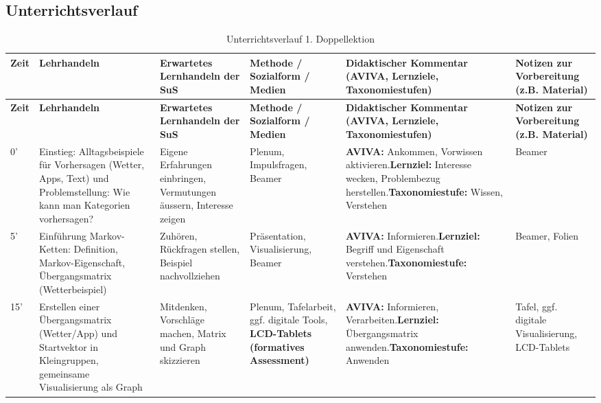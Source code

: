 \begin{landscape}
    
    \section*{Unterrichtsverlauf}


        \begin{longtable}{@{}l|p{5cm}|p{5cm}|p{4cm}|p{5cm}|p{5cm}@{}}
            \caption{Unterrichtsverlauf 1. Doppellektion}\\
            \textbf{Zeit} & \textbf{Lehrhandeln} & \textbf{Erwartetes Lernhandeln der SuS} & \textbf{Methode / Sozialform / Medien} & \textbf{Didaktischer Kommentar (AVIVA, Lernziele, Taxonomiestufen)} & \textbf{Notizen zur Vorbereitung (z.B. Material)} \\\midrule\midrule
            \endfirsthead
            \textbf{Zeit} & \textbf{Lehrhandeln} & \textbf{Erwartetes Lernhandeln der SuS} & \textbf{Methode / Sozialform / Medien} & \textbf{Didaktischer Kommentar (AVIVA, Lernziele, Taxonomiestufen)} & \textbf{Notizen zur Vorbereitung (z.B. Material)} \\\midrule\midrule
            \endhead
            0'  & Einstieg: Alltagsbeispiele für Vorhersagen (Wetter, Apps, Text) und Problemstellung: Wie kann man Kategorien vorhersagen? & Eigene Erfahrungen einbringen, Vermutungen äussern, Interesse zeigen & Plenum, Impulsfragen, Beamer & \textbf{AVIVA:} Ankommen, Vorwissen aktivieren.\newline\textbf{Lernziel:} Interesse wecken, Problembezug herstellen.\newline\textbf{Taxonomiestufe:} Wissen, Verstehen & Beamer \\\midrule
            
            5'  & Einführung Markov-Ketten: Definition, Markov-Eigenschaft, Übergangsmatrix (Wetterbeispiel) & Zuhören, Rückfragen stellen, Beispiel nachvollziehen & Präsentation, Visualisierung, Beamer & \textbf{AVIVA:} Informieren.\newline\textbf{Lernziel:} Begriff und Eigenschaft verstehen.\newline\textbf{Taxonomiestufe:} Verstehen & Beamer, Folien \\\midrule

            15' & Erstellen einer Übergangsmatrix (Wetter/App) und Startvektor in Kleingruppen, gemeinsame Visualisierung als Graph & Mitdenken, Vorschläge machen, Matrix und Graph skizzieren & Plenum, Tafelarbeit, ggf. digitale Tools, \textbf{LCD-Tablets (formatives Assessment)} & \textbf{AVIVA:} Informieren, Verarbeiten.\newline\textbf{Lernziel:} Übergangsmatrix anwenden.\newline\textbf{Taxonomiestufe:} Anwenden & Tafel, ggf. digitale Visualisierung, LCD-Tablets \\\midrule


\end{longtable}
\end{landscape}
